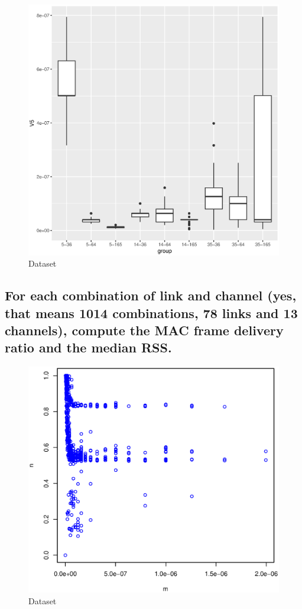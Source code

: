 \documentclass [12 pt , a4paper ] {article}
\begin{document}
\begin{figure}[!ht]
  \centering
  \includegraphics[scale=0.8]{boxplot.eps}
  \caption{Dataset}
  \label{fig:Dataset}
\end{figure}
\subsection{For each combination of link and channel (yes, that means
 1014 combinations, 78 links and 13
channels), compute the MAC frame delivery ratio and the median RSS.}
\begin{figure}[!ht]
  \centering
  \includegraphics[scale=0.8]{medianvsfdr.eps}
  \caption{Dataset}
  \label{fig:rssvsn}
\end{figure}
\end{document}

